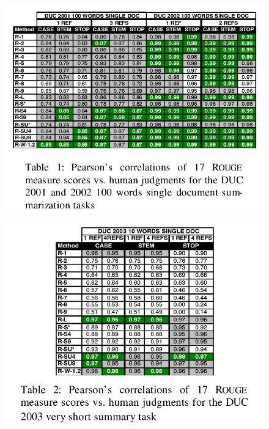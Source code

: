 \documentclass[xcolor={table}]{beamer}
\begin{document}
\begin{frame}[t]{\cite{lin2004rouge}}
      \begin{figure}[h]
          \centering
      \includegraphics[scale=.25]{images/table1-lin04.png} \\
  \end{figure}
\end{frame}

\begin{frame}[t]{\cite{lin2004rouge}}
      \begin{figure}[h]
          \centering
      \includegraphics[scale=.25]{images/table2-lin04.png} \\
  \end{figure}
\end{frame}
\end{document}
